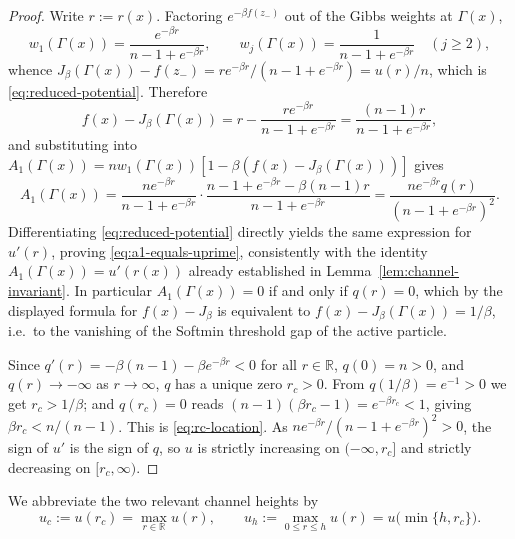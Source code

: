 \documentclass{opt2026} %
\newcommand{\prefactor}[2]{A_{#1}(#2)}
\newcommand{\R}{\mathbb{R}}
\begin{document}
\begin{proof}
    Write $r:=r(x)$. Factoring $e^{-\beta f(z_-)}$ out of the Gibbs weights at $\Gamma(x)$,
    \[
        w_1(\Gamma(x))=\frac{e^{-\beta r}}{n-1+e^{-\beta r}}, \qquad w_j(\Gamma(x))=\frac{1}{n-1+e^{-\beta r}} \quad (j\ge2),
    \]
    whence $J_\beta(\Gamma(x))-f(z_-)=re^{-\beta r}/(n-1+e^{-\beta r})=u(r)/n$, which is \eqref{eq:reduced-potential}. Therefore
    \[
        f(x)-J_\beta(\Gamma(x)) = r-\frac{re^{-\beta r}}{n-1+e^{-\beta r}} = \frac{(n-1)r}{n-1+e^{-\beta r}},
    \]
    and substituting into $\prefactor{1}{\Gamma(x)}=nw_1(\Gamma(x))[1-\beta(f(x)-J_\beta(\Gamma(x)))]$ gives
    \[
        \prefactor{1}{\Gamma(x)} = \frac{ne^{-\beta r}}{n-1+e^{-\beta r}}\cdot\frac{n-1+e^{-\beta r}-\beta(n-1)r}{n-1+e^{-\beta r}} = \frac{ne^{-\beta r}q(r)}{(n-1+e^{-\beta r})^2}.
    \]
    Differentiating \eqref{eq:reduced-potential} directly yields the same expression for $u'(r)$, proving \eqref{eq:a1-equals-uprime}, consistently with the identity $\prefactor{1}{\Gamma(x)}=u'(r(x))$ already established in Lemma~\ref{lem:channel-invariant}. In particular $\prefactor{1}{\Gamma(x)}=0$ if and only if $q(r)=0$, which by the displayed formula for $f(x)-J_\beta$ is equivalent to $f(x)-J_\beta(\Gamma(x))=1/\beta$, i.e.\ to the vanishing of the Softmin threshold gap of the active particle.

    Since $q'(r)=-\beta(n-1)-\beta e^{-\beta r}<0$ for all $r\in\R$, $q(0)=n>0$, and $q(r)\to-\infty$ as $r\to\infty$, $q$ has a unique zero $r_c>0$. From $q(1/\beta)=e^{-1}>0$ we get $r_c>1/\beta$; and $q(r_c)=0$ reads $(n-1)(\beta r_c-1)=e^{-\beta r_c}<1$, giving $\beta r_c<n/(n-1)$. This is \eqref{eq:rc-location}. As $ne^{-\beta r}/(n-1+e^{-\beta r})^2>0$, the sign of $u'$ is the sign of $q$, so $u$ is strictly increasing on $(-\infty,r_c]$ and strictly decreasing on $[r_c,\infty)$.
\end{proof}

We abbreviate the two relevant channel heights by
\begin{equation}
    u_c:=u(r_c)=\max_{r\in\R}u(r),
    \qquad
    u_h:=\max_{0\le r\le h}u(r)=u\bigl(\min\{h,r_c\}\bigr).
    \label{eq:channel-heights}
\end{equation}
\end{document}
